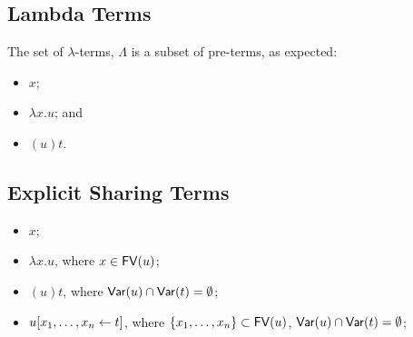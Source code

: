 \documentclass[10pt,a4paper]{article}
\theoremstyle{definition}
\theoremstyle{plain}
\theoremstyle{remark}
\begin{document}
% 
% 
% 
% 

\subsection{Lambda Terms}

The set of $\lambda$-terms, $\Lambda$ is a subset of pre-terms, as expected:

\begin{itemize}
	\item $x$;
	\item $\lambda x.u$; and
	\item $(u)t$.
\end{itemize}

\subsection{Explicit Sharing Terms}


\begin{itemize}
	\item $x$;
	\item $\lambda x.u$, where $x\in{\mathop{\mathsf{FV}}}(u)$;
	\item $(u)t$, where ${\mathop{\mathsf{Var}}}(u)\cap{\mathop{\mathsf{Var}}}(t)=\emptyset$;
\end{itemize}
\begin{itemize}
	\item ${ { {u}[{{x_1},\dots,{x_n}}\leftarrow{t}] } }$, where $\{x_1,\dots,x_n\}\subset{\mathop{\mathsf{FV}}}(u)$, ${\mathop{\mathsf{Var}}}(u)\cap{\mathop{\mathsf{Var}}}(t)=\emptyset$;
\end{itemize}
\end{document}
